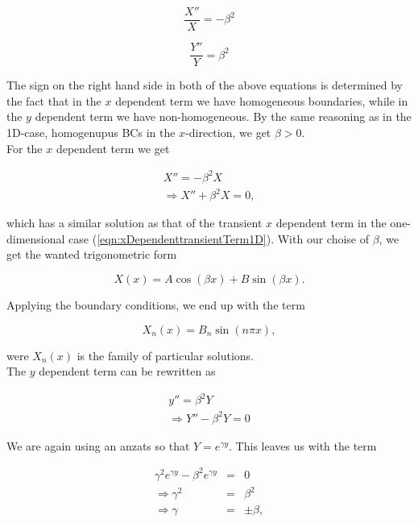 \documentclass{article}
\begin{document}
\begin{equation}
\frac{X''}{X} = -\beta^2 \nonumber
\end{equation}

\begin{equation}
\frac{Y''}{Y} = \beta^2 \nonumber
\end{equation}

The sign on the right hand side in both of the above equations is determined by the fact that in the $x$ dependent term we have homogeneous boundaries, while in the $y$ dependent term we have non-homogeneous. By the same reasoning as in the 1D-case, homogenupus BCs in the $x$-direction, we get $\beta > 0$. \\

For the $x$ dependent term we get

\begin{eqnarray}
\nonumber
X'' = -\beta^2 X \\ \nonumber
\Rightarrow X'' + \beta^2 X = 0,
\end{eqnarray}

which has a similar solution as that of the transient $x$ dependent term in the one-dimensional case (\ref{eqn:xDependenttransientTerm1D}). With our choise of $\beta$, we get the wanted trigonometric form

\begin{equation}
X(x) = A\cos(\beta x) + B\sin(\beta x) \nonumber.
\end{equation}

Applying the boundary conditions, we end up with the term

\begin{equation}
X_n(x) = B_n\sin(n\pi x),
\label{eqn:xDependenSteadyState2D}
\end{equation}

were ${X_n(x)}$ is the family of particular solutions.\\

The $y$ dependent term can be rewritten as 

\begin{subequations}
	\begin{eqnarray}
	y'' = \beta^2 Y \\ 
	\Rightarrow Y'' - \beta^2 Y = 0 
	\end{eqnarray}
\end{subequations}

We are again using an anzats so that $Y = e^{\gamma y}$. This leaves us with the term

\begin{subequations}
	\begin{eqnarray}
	\gamma^2 e^{\gamma y} - \beta^2 e^{\gamma y} &=& 0 \\ 
	\Rightarrow \gamma^2 &=& \beta^2 \\ 
	\Rightarrow \gamma &=& \pm \beta,
	\end{eqnarray}
\end{subequations}
\end{document}
